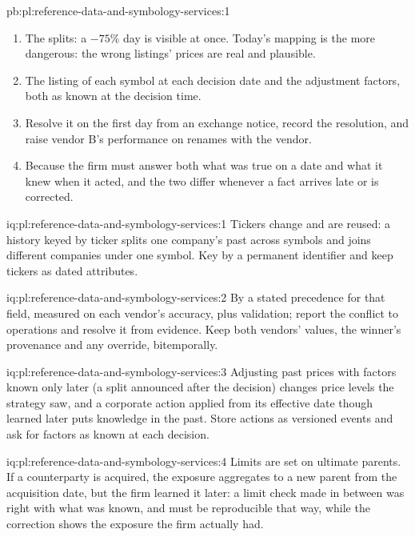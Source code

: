 \begin{solution}{pb:pl:reference-data-and-symbology-services:1}
\begin{enumerate}
unadjusted prices it returns $-16.6\%$, 40.1 points wrong, of which unadjusted splits alone account for $-45.8$ points and today's
mapping alone for $+5.7$.
\item The splits: a $-75\%$ day is visible at once. Today's mapping is the more dangerous: the wrong listings' prices are real and
plausible.
\item The listing of each symbol at each decision date and the adjustment factors, both as known at the decision time.
\item Resolve it on the first day from an exchange notice, record the resolution, and raise vendor B's performance on renames with
the vendor.
\item Because the firm must answer both what was true on a date and what it knew when it acted, and the two differ whenever a fact
arrives late or is corrected.
\end{enumerate}
\end{solution}

\begin{solution}{iq:pl:reference-data-and-symbology-services:1}
Tickers change and are reused: a history keyed by ticker splits one company's past across symbols and joins different companies
under one symbol. Key by a permanent identifier and keep tickers as dated attributes.
\end{solution}

\begin{solution}{iq:pl:reference-data-and-symbology-services:2}
By a stated precedence for that field, measured on each vendor's accuracy, plus validation; report the conflict to operations and
resolve it from evidence. Keep both vendors' values, the winner's provenance and any override, bitemporally.
\end{solution}

\begin{solution}{iq:pl:reference-data-and-symbology-services:3}
Adjusting past prices with factors known only later (a split announced after the decision) changes price levels the strategy saw,
and a corporate action applied from its effective date though learned later puts knowledge in the past. Store actions as versioned
events and ask for factors as known at each decision.
\end{solution}

\begin{solution}{iq:pl:reference-data-and-symbology-services:4}
Limits are set on ultimate parents. If a counterparty is acquired, the exposure aggregates to a new parent from the acquisition
date, but the firm learned it later: a limit check made in between was right with what was known, and must be reproducible that
way, while the correction shows the exposure the firm actually had.
\end{solution}


